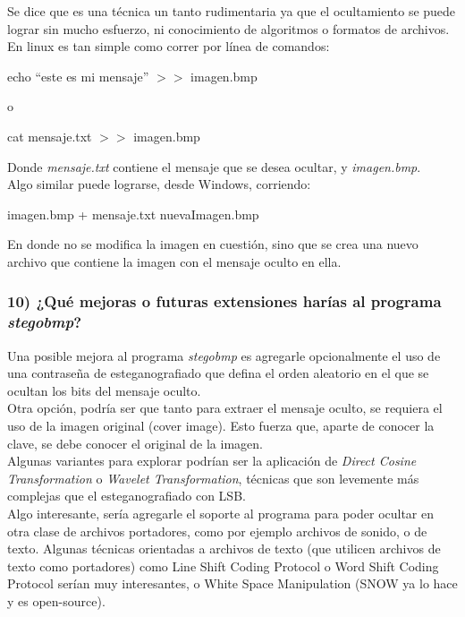 \documentclass[a4paper,10pt]{article}
\begin{document}
Se dice que es una técnica un tanto rudimentaria ya que el ocultamiento se puede lograr sin mucho esfuerzo, ni conocimiento de algoritmos o formatos de archivos. En linux es tan simple 
como correr por línea de comandos:

\begin{center}
    echo ``este es mi mensaje'' $>>$ imagen.bmp
\end{center}
o
\begin{center}
    cat mensaje.txt $>>$ imagen.bmp
\end{center}

Donde \textit{mensaje.txt} contiene el mensaje que se desea ocultar, y \textit{imagen.bmp}.\\

Algo similar puede lograrse, desde Windows, corriendo:
\begin{center}
    imagen.bmp + mensaje.txt nuevaImagen.bmp
\end{center}

En donde no se modifica la imagen en cuestión, sino que se crea una nuevo archivo que contiene la imagen con el mensaje oculto en ella.

\subsubsection*{ 10) ¿Qué mejoras o futuras extensiones harías al programa \textit{stegobmp}?}

Una posible mejora al programa \textit{stegobmp} es agregarle opcionalmente el uso de una contraseña de esteganografiado que defina el orden aleatorio en el que
se ocultan los bits del mensaje oculto. \\

Otra opción, podría ser que tanto para extraer el mensaje oculto, se requiera el uso de la imagen original (cover image). Esto fuerza que, aparte de conocer la clave, 
se debe conocer el original de la imagen.\\

Algunas variantes para explorar podrían ser la aplicación de \textit{Direct Cosine Transformation} o \textit{Wavelet Transformation}, técnicas que son levemente más complejas 
que el esteganografiado con LSB.\\

Algo interesante, sería agregarle el soporte al programa para poder ocultar en otra clase de archivos portadores, como por ejemplo archivos de sonido, o de texto. Algunas
técnicas orientadas a archivos de texto (que utilicen archivos de texto como portadores) como Line Shift Coding Protocol o Word Shift Coding Protocol serían 
muy interesantes, o White Space Manipulation (SNOW ya lo hace y es open-source).
\end{document}
